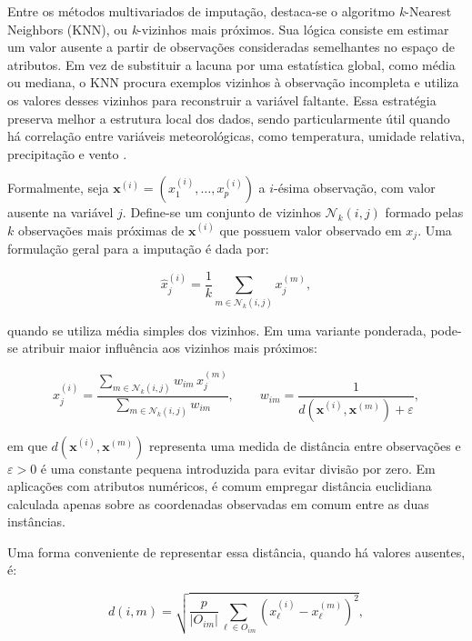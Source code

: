 Entre os métodos multivariados de imputação, destaca-se o algoritmo \textit{k}-Nearest Neighbors (KNN), ou \textit{k}-vizinhos mais próximos. Sua lógica consiste em estimar um valor ausente a partir de observações consideradas semelhantes no espaço de atributos. Em vez de substituir a lacuna por uma estatística global, como média ou mediana, o KNN procura exemplos vizinhos à observação incompleta e utiliza os valores desses vizinhos para reconstruir a variável faltante. Essa estratégia preserva melhor a estrutura local dos dados, sendo particularmente útil quando há correlação entre variáveis meteorológicas, como temperatura, umidade relativa, precipitação e vento \cite{troyanskaya2001missing,alejosanchez2025review}.

Formalmente, seja $\mathbf{x}^{(i)} = (x^{(i)}_1, \dots, x^{(i)}_p)$ a $i$-ésima observação, com valor ausente na variável $j$. Define-se um conjunto de vizinhos $\mathcal{N}_k(i,j)$ formado pelas $k$ observações mais próximas de $\mathbf{x}^{(i)}$ que possuem valor observado em $x_j$. Uma formulação geral para a imputação é dada por:

\begin{equation}
\hat{x}^{(i)}_j = \frac{1}{k} \sum_{m \in \mathcal{N}_k(i,j)} x^{(m)}_j,
\end{equation}

quando se utiliza média simples dos vizinhos. Em uma variante ponderada, pode-se atribuir maior influência aos vizinhos mais próximos:

\begin{equation}
\hat{x}^{(i)}_j =
\frac{\sum_{m \in \mathcal{N}_k(i,j)} w_{im} \, x^{(m)}_j}
{\sum_{m \in \mathcal{N}_k(i,j)} w_{im}},
\qquad
w_{im} = \frac{1}{d(\mathbf{x}^{(i)}, \mathbf{x}^{(m)}) + \varepsilon},
\end{equation}

em que $d(\mathbf{x}^{(i)}, \mathbf{x}^{(m)})$ representa uma medida de distância entre observações e $\varepsilon > 0$ é uma constante pequena introduzida para evitar divisão por zero. Em aplicações com atributos numéricos, é comum empregar distância euclidiana calculada apenas sobre as coordenadas observadas em comum entre as duas instâncias.

Uma forma conveniente de representar essa distância, quando há valores ausentes, é:

\begin{equation}
d(i,m) =
\sqrt{
\frac{p}{|O_{im}|}
\sum_{\ell \in O_{im}}
\left(x^{(i)}_{\ell} - x^{(m)}_{\ell}\right)^2
},
\end{equation}

